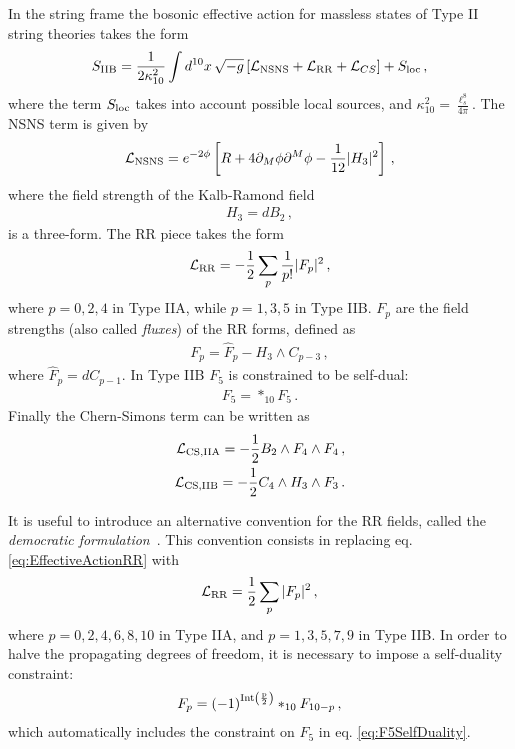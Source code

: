 \documentclass[12pt,a4paper]{book}
\newcommand\La{{\mathcal{L}}}
\begin{document}
In the string frame the bosonic effective action for massless states of Type II string theories takes the form
\begin{align}
\label{eq:EffectiveAction}
S_{\rm IIB} = \frac{1}{2 \kappa_{10}^2} \int d^{10}x\,\sqrt{-g} \left[\La_{\rm NSNS} + \La_{\rm RR} + \La_{CS}\right] + S_{\rm loc}\,,
\end{align}
where the term $S_{\rm loc}$ takes into account possible local sources, and $\kappa_{10}^2 = \frac{\ell_s^8}{4 \pi}$. The NSNS term is given by
\begin{align}
\label{eq:EffectiveActionNSNS}
\La_{\rm NSNS} = e^{-2 \phi} \left[R + 4 \partial_M \phi \partial^M \phi - \frac{1}{12} |H_3|^2\right]\,,
\end{align}
where the field strength of the Kalb-Ramond field
\begin{align}
\label{eq:H3Definition}
H_3 = dB_2 \,,
\end{align}
is a three-form. The RR piece takes the form
\begin{align}
\label{eq:EffectiveActionRR}
\La_{\rm RR} = - \frac{1}{2} \sum_p \frac{1}{p!} |F_p|^2 \,,
\end{align}
where $p = 0, 2, 4$ in Type IIA, while $p = 1, 3, 5$ in Type IIB. $F_p$ are the field strengths (also called \textit{fluxes}) of the RR forms, defined as
\begin{align}
\label{eq:FluxesFirstConvention}
F_p = \hat{F}_p - H_3 \wedge C_{p-3} \,,
\end{align}
where $\hat{F}_p = dC_{p-1}$. In Type IIB $F_5$ is constrained to be self-dual:
\begin{align}
\label{eq:F5SelfDuality}
F_5 = *_{10} F_5 \,.
\end{align}
Finally the Chern-Simons term can be written as
\begin{align}
\label{eq:CSAction}
\La_{\rm CS, IIA} = -\frac{1}{2} B_2 \wedge F_4 \wedge F_4 \,,\\
\La_{\rm CS, IIB} = -\frac{1}{2} C_4 \wedge H_3 \wedge F_3 \,.
\end{align}

It is useful to introduce an alternative convention for the RR fields, called the \textit{democratic formulation}~\cite{Bergshoeff:2001pv}. This convention consists in replacing eq. \eqref{eq:EffectiveActionRR} with
\begin{align}
\label{eq:EffectiveActionRRDemocratic}
\La_{\rm RR} = \frac{1}{2} \sum_p |F_p|^2\,,
\end{align}
where $p = 0, 2, 4, 6, 8, 10$ in Type IIA, and $p = 1, 3, 5, 7, 9$ in Type IIB. In order to halve the propagating degrees of freedom, it is necessary to impose a self-duality constraint:
\begin{align}
\label{eq:RRSelfDuality}
F_p = \left(-1\right)^{\rm{Int}\left(\frac{p}{2}\right)} *_{10} F_{10-p} \,,
\end{align}
which automatically includes the constraint on $F_5$ in eq. \eqref{eq:F5SelfDuality}.\\
\end{document}
